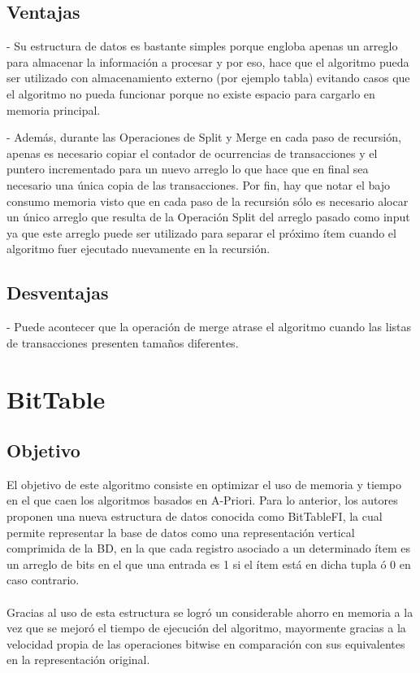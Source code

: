 \documentclass[12pt,spanish]{article}
\begin{document}
\subsection{Ventajas}

- Su estructura de datos es bastante simples porque engloba apenas un arreglo para almacenar la información a procesar y por eso, hace que el algoritmo pueda ser utilizado con almacenamiento  externo (por ejemplo tabla) evitando casos que el algoritmo no pueda funcionar porque no existe espacio para cargarlo en memoria principal.

- Además, durante las Operaciones de Split y Merge en cada paso de recursión, apenas es necesario copiar el contador de ocurrencias de transacciones y el puntero incrementado para un nuevo arreglo lo que hace que en final sea necesario una única copia de las transacciones. Por fin, hay que notar el bajo consumo memoria visto que en cada paso de la recursión sólo es necesario alocar un único arreglo que resulta de la Operación Split  del  arreglo pasado como input ya que este arreglo puede ser utilizado para separar el próximo ítem cuando el algoritmo fuer ejecutado nuevamente en la recursión.

\subsection{Desventajas}

- Puede acontecer que la operación de merge atrase el algoritmo cuando las listas de transacciones presenten tamaños diferentes.

\section{BitTable}

\subsection{Objetivo}

El objetivo de este algoritmo consiste en optimizar el uso de memoria y tiempo en el que caen los algoritmos basados en A-Priori. Para lo anterior, los autores proponen una nueva estructura de datos conocida como BitTableFI, la cual permite representar la base de datos como una representación vertical comprimida de la BD, en la que cada registro asociado a un determinado ítem es un arreglo de bits en el que una entrada es 1 si el ítem está en dicha tupla ó 0 en caso contrario.
\\\\
Gracias al uso de esta estructura se logró un considerable ahorro en memoria a la vez que se mejoró el tiempo de ejecución del algoritmo, mayormente gracias a la velocidad propia de las operaciones bitwise en comparación con sus equivalentes en la representación original.
\end{document}
